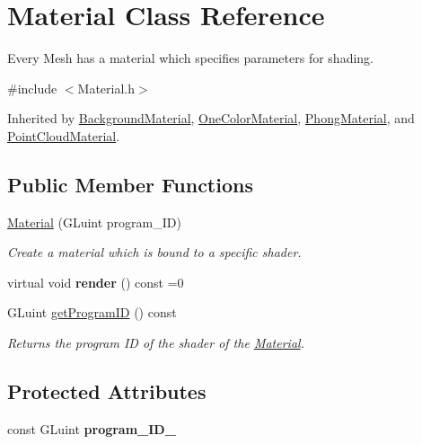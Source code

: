 \hypertarget{class_material}{\section{Material Class Reference}
\label{class_material}
}


Every Mesh has a material which specifies parameters for shading.  




{\ttfamily \#include $<$Material.\-h$>$}



Inherited by \hyperlink{class_background_material}{Background\-Material}, \hyperlink{class_one_color_material}{One\-Color\-Material}, \hyperlink{class_phong_material}{Phong\-Material}, and \hyperlink{class_point_cloud_material}{Point\-Cloud\-Material}.

\subsection*{Public Member Functions}
\begin{DoxyCompactItemize}
\item 
\hyperlink{class_material_aeb844696886b650724958ae2eb3440f6}{Material} (G\-Luint program\-\_\-\-I\-D)
\begin{DoxyCompactList}\small\item\em Create a material which is bound to a specific shader. \end{DoxyCompactList}\item 
\hypertarget{class_material_a9806edb1cded956ef4699f6f86b3244b}{virtual void {\bfseries render} () const =0}\label{class_material_a9806edb1cded956ef4699f6f86b3244b}

\item 
\hypertarget{class_material_a77f272bb5ad8dc7d2643db5383378dd8}{G\-Luint \hyperlink{class_material_a77f272bb5ad8dc7d2643db5383378dd8}{get\-Program\-I\-D} () const }\label{class_material_a77f272bb5ad8dc7d2643db5383378dd8}

\begin{DoxyCompactList}\small\item\em Returns the program I\-D of the shader of the \hyperlink{class_material}{Material}. \end{DoxyCompactList}\end{DoxyCompactItemize}
\subsection*{Protected Attributes}
\begin{DoxyCompactItemize}
\item 
\hypertarget{class_material_a61ac1d7314cdb0b14311eb1787f6c192}{const G\-Luint {\bfseries program\-\_\-\-I\-D\-\_\-}}\label{class_material_a61ac1d7314cdb0b14311eb1787f6c192}

\end{DoxyCompactItemize}


